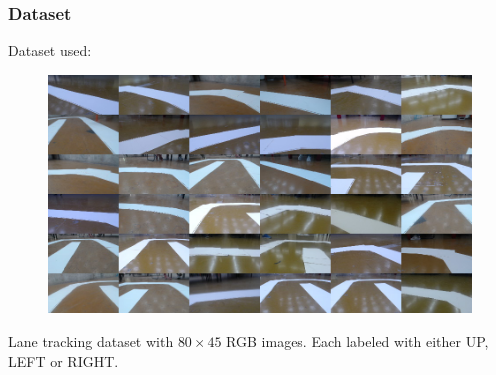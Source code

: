 \documentclass{beamer}
\begin{document}
\begin{frame}
  \frametitle{Dataset}

  Dataset used: \cite{self-driving}

  \begin{figure}
    \centering\includegraphics[height=0.5\textheight]{imgs/montage_raw.png}
  \end{figure}

  Lane tracking dataset with $80\times 45$ RGB images. Each labeled with either UP, LEFT or RIGHT.
\end{frame}
\end{document}
